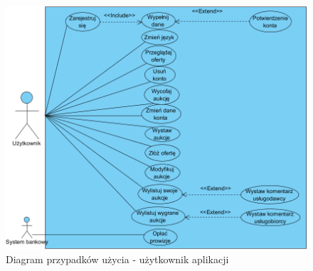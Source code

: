 \documentclass[10pt,titlepage]{article} %
\begin{document}
\begin{figure}[H]
\includegraphics[width=\textwidth]{img/sekcja2/uzytkownikPU}
\caption[Diagram przypadków użycia - użytkownik aplikacji]{Diagram przypadków użycia - użytkownik aplikacji}
\end{figure}
\end{document}
